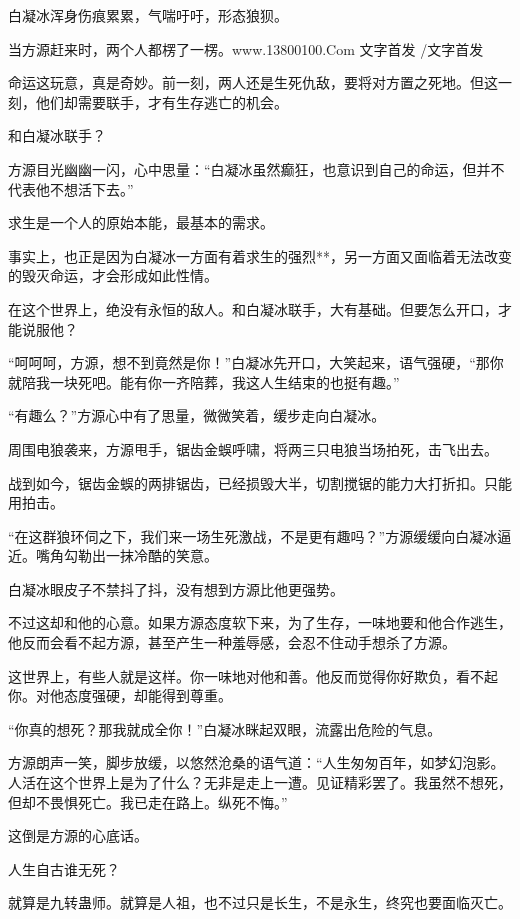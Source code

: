 
\begin{this_body}

白凝冰浑身伤痕累累，气喘吁吁，形态狼狈。

当方源赶来时，两个人都楞了一楞。www.13800100.Com 文字首发 /文字首发

命运这玩意，真是奇妙。前一刻，两人还是生死仇敌，要将对方置之死地。但这一刻，他们却需要联手，才有生存逃亡的机会。

和白凝冰联手？

方源目光幽幽一闪，心中思量：“白凝冰虽然癫狂，也意识到自己的命运，但并不代表他不想活下去。”

求生是一个人的原始本能，最基本的需求。

事实上，也正是因为白凝冰一方面有着求生的强烈**，另一方面又面临着无法改变的毁灭命运，才会形成如此性情。

在这个世界上，绝没有永恒的敌人。和白凝冰联手，大有基础。但要怎么开口，才能说服他？

“呵呵呵，方源，想不到竟然是你！”白凝冰先开口，大笑起来，语气强硬，“那你就陪我一块死吧。能有你一齐陪葬，我这人生结束的也挺有趣。”

“有趣么？”方源心中有了思量，微微笑着，缓步走向白凝冰。

周围电狼袭来，方源甩手，锯齿金蜈呼啸，将两三只电狼当场拍死，击飞出去。

战到如今，锯齿金蜈的两排锯齿，已经损毁大半，切割搅锯的能力大打折扣。只能用拍击。

“在这群狼环伺之下，我们来一场生死激战，不是更有趣吗？”方源缓缓向白凝冰逼近。嘴角勾勒出一抹冷酷的笑意。

白凝冰眼皮子不禁抖了抖，没有想到方源比他更强势。

不过这却和他的心意。如果方源态度软下来，为了生存，一味地要和他合作逃生，他反而会看不起方源，甚至产生一种羞辱感，会忍不住动手想杀了方源。

这世界上，有些人就是这样。你一味地对他和善。他反而觉得你好欺负，看不起你。对他态度强硬，却能得到尊重。

“你真的想死？那我就成全你！”白凝冰眯起双眼，流露出危险的气息。

方源朗声一笑，脚步放缓，以悠然沧桑的语气道：“人生匆匆百年，如梦幻泡影。人活在这个世界上是为了什么？无非是走上一遭。见证精彩罢了。我虽然不想死，但却不畏惧死亡。我已走在路上。纵死不悔。”

这倒是方源的心底话。

人生自古谁无死？

就算是九转蛊师。就算是人祖，也不过只是长生，不是永生，终究也要面临灭亡。


\end{this_body}
